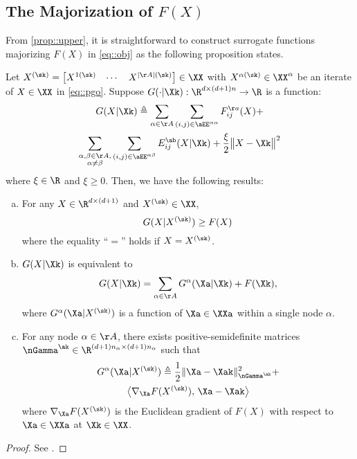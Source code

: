 \subsection{The Majorization of $F(X)$}
From \cref{prop::upper}, it is straightforward to construct surrogate functions majorizing $F(X)$ in \cref{eq::obj} as the following proposition states.

\begin{prop}\label{prop::G}

	Let $X^{(\sk)}=\begin{bmatrix}
	X^{1(\sk)} & \cdots & X^{|\AA|(\sk)}
	\end{bmatrix}\in \XX$ with $X^{\alpha(\sk)}\in \XX^\alpha$ be an iterate of $X\in \XX$ in \cref{eq::pgo}. Suppose $G(\cdot|\Xk): \R^{d\times(d+1)n}\rightarrow\R$ is a function:
	\begin{multline}\label{eq::G}
		G(X|\Xk)\triangleq \sum_{\alpha\in\AA}\sum_{(i,j)\in \aEE^{\alpha\alpha}}F_{ij}^{\aa}(X)+\\
		\sum_{\substack{\alpha,\beta\in\AA,\\
				\alpha\neq \beta}}\sum_{(i,j)\in \aEE^{\alpha\beta}} E_{ij}^{\ab}(X|\Xk)+\frac{\xi}{2}\big\|X-\Xk\big\|^2
	\end{multline}
	where $\xi\in\R$ and $\xi\geq 0$. Then, we have the following results:
{\highlight
	\begin{enumerate}[(a)]
	\item \label{prop::G1}  For any $X\in\R^{d\times(d+1)}$ and $X^{(\sk)}\in\XX$, 	
	\begin{equation}\label{eq::GF}
		G(X|X^{(\sk)})\geq F(X)
	\end{equation}
	where the equality ``$=$'' holds if  $X=X^{(\sk)}$.
	\item \label{prop::G2} $G(X|\Xk)$ is equivalent to
	\begin{equation}\label{eq::G2}
		G(X|\Xk)=\sum_{\alpha\in\AA} G^{\alpha}(\Xa|\Xk)  + F(\Xk),
	\end{equation}
	where $G^\alpha(\Xa|X^{(\sk)})$ is a function of $\Xa\in\XXa$ within a single node $\alpha$. 
	\item\label{prop::G3}  For any node $\alpha\in\AA$, there exists positive-semidefinite matrices $\nGamma^{\ak}\in \R^{(d+1)n_\alpha\times (d+1)n_\alpha}$ such that 
	\begin{multline}\label{eq::GMa}
	G^\alpha(\Xa|X^{(\sk)}) \triangleq \frac{1}{2}\|\Xa-\Xak\|_{\nGamma^{\ak}}^2+\\
	\big\langle\nabla_{\Xa} F(X^{(\sk)}),\,{\Xa-\Xak}\big\rangle
	\end{multline}
	where $\nabla_{\Xa} F(X^{(\sk)})$ is the Euclidean gradient of $F(X)$ with respect to $\Xa\in \XXa$ at $\Xk\in\XX$.
	\end{enumerate}
}
\end{prop}
\begin{proof}
	See .
\end{proof}




